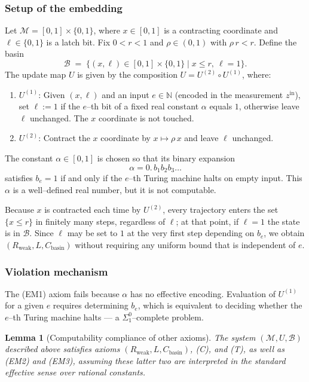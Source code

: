 \documentclass[12pt]{article}
\theoremstyle{definition}
\theoremstyle{plain}
\newtheorem{lemma}{Lemma}[section]
\begin{document}
\subsubsection*{Setup of the embedding}
Let $\mathcal M = [0,1]\times\{0,1\}$, where $x\in[0,1]$ is a contracting coordinate and $\ell\in\{0,1\}$ is a latch bit.
Fix $0<r<1$ and $\rho\in(0,1)$ with $\rho\,r<r$.
Define the basin
\[
  \mathcal B \;=\; \{(x,\ell)\in[0,1]\times\{0,1\} \mid x\le r,\ \ell=1\}.
\]
The update map $U$ is given by the composition $U = U^{(2)}\circ U^{(1)}$, where:

\begin{enumerate}
\item $U^{(1)}$: Given $(x,\ell)$ and an input $e\in\mathbb N$ (encoded in the measurement $z^{\mathrm{in}}$), set $\ell := 1$ if the $e$–th bit of a fixed real constant $\alpha$ equals $1$, otherwise leave $\ell$ unchanged. The $x$ coordinate is not touched.

\item $U^{(2)}$: Contract the $x$ coordinate by $x\mapsto \rho\,x$ and leave $\ell$ unchanged.
\end{enumerate}

The constant $\alpha\in[0,1]$ is chosen so that its binary expansion
\[
  \alpha = 0.\,b_1 b_2 b_3 \dots
\]
satisfies $b_e = 1$ if and only if the $e$–th Turing machine halts on empty input.
This $\alpha$ is a well–defined real number, but it is not computable.

Because $x$ is contracted each time by $U^{(2)}$, every trajectory enters the set $\{x\le r\}$ in finitely many steps, regardless of $\ell$; at that point, if $\ell=1$ the state is in $\mathcal B$. Since $\ell$ may be set to $1$ at the very first step depending on $b_e$, we obtain $(R_{\mathrm{weak}},L,C_{\mathrm{basin}})$ without requiring any uniform bound that is independent of $e$.

\subsubsection*{Violation mechanism}
The \textup{(EM1)} axiom fails because $\alpha$ has no effective encoding. Evaluation of $U^{(1)}$ for a given $e$ requires determining $b_e$, which is equivalent to deciding whether the $e$–th Turing machine halts — a $\Sigma^0_1$–complete problem.

\begin{lemma}[Computability compliance of other axioms]
\label{lem:EM1-violation-computability}
The system $(\mathcal M, U, \mathcal B)$ described above satisfies axioms $(R_{\mathrm{weak}},L,C_{\mathrm{basin}})$, \textup{(C)}, and \textup{(T)}, as well as \textup{(EM2)} and \textup{(EM3)}, assuming these latter two are interpreted in the standard effective sense over rational constants.
\end{lemma}
\end{document}
